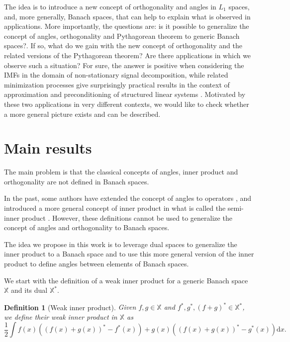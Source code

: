\documentclass{article}
\def\dx{{\textrm{d}x}}
\newtheorem{definition}{Definition}
\begin{document}
The idea is to introduce a new concept of orthogonality and angles in $L_1$ spaces, and, more generally, Banach spaces, {that can help to explain what is observed in applications}. More importantly, the questions are:  is it possible to generalize the concept of angles, orthogonality and Pythagorean theorem to generic Banach spaces?. If so, what do we gain with the new concept of orthogonality and the related versions of the Pythagorean theorem? Are there applications in which we observe such a situation? For sure, the answer is positive when considering the IMFs in the domain of non-stationary signal decomposition, while related minimization processes give surprisingly practical results in the context of approximation and preconditioning of structured linear systems \cite{Ng_book,GLT-bookI}. Motivated by these two applications in very different contexts, we would like to check whether a more general picture exists and can be described.

\section{Main results}\label{sec:Results}

The main problem is that the classical concepts of angles, inner product  {and orthogonality} are not defined in Banach spaces.

In the past, some authors have extended the concept of angles to operators \cite{gustafson1968angle,axler1997numerical}, and introduced a more general concept of inner product in what is called the semi-inner product \cite{lumer1961semi}. However, these definitions cannot be used to generalize the concept of angles and orthogonality to Banach spaces.

The idea we propose in this work is to leverage dual spaces to generalize the inner product to a Banach space and to use this more general version of the inner product to define angles between elements of Banach spaces.

We start with the definition of a weak inner product for a generic Banach space $\mathbb{X}$ and its dual $\mathbb{X}^*$.

\begin{definition}[Weak inner product]\label{def:inner_X} %
Given $f, g \in \mathbb{X}$ and $f^*, g^*, (f+g)^* \in\mathbb{X}^*$, we define their weak inner product in $\mathbb{X}$ as
\begin{equation}\label{eq:Inner_X}
	\frac{1}{2} \int f(x)\left((f(x)+g(x))^*-f^*(x)\right)+g(x)\left((f(x)+g(x))^*-g^*(x)\right) \dx.
\end{equation}
\end{definition}
\end{document}
